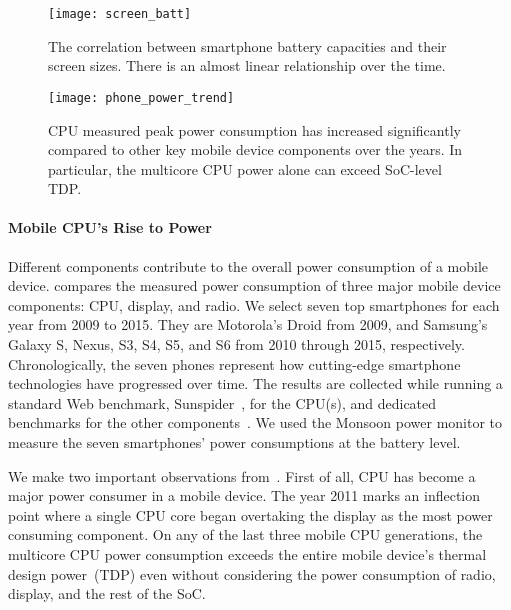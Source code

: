 \begin{figure}[t]
  \centering
  \texttt{[image: screen\_batt]}
  \caption{The correlation between smartphone battery capacities and their screen sizes. There is an almost linear relationship over the time.}
  \label{fig:screen_batt}
\end{figure}

\begin{figure}[t]
  \centering
  \texttt{[image: phone\_power\_trend]}
  \caption{CPU measured peak power consumption has increased significantly compared to other key mobile device components over the years. In particular, the multicore CPU power alone can exceed SoC-level TDP.}
  \label{fig:phone_power_trend}
\end{figure}

\paragraph{Mobile CPU's Rise to Power} Different components contribute to the overall power consumption of a mobile device.  compares the measured power consumption of three major mobile device components: CPU, display, and radio. We select seven top smartphones for each year from 2009 to 2015. They are Motorola's Droid from 2009, and Samsung's Galaxy S, Nexus, S3, S4, S5, and S6 from 2010 through 2015, respectively. Chronologically, the seven phones represent how cutting-edge smartphone technologies have progressed over time. The results are collected while running a standard Web benchmark, Sunspider~\cite{sunspider}, for the CPU(s), and dedicated benchmarks for the other components~\cite{carroll2010analysis,ookla}. We used the Monsoon power monitor to measure the seven smartphones' power consumptions at the battery level.

We make two important observations from~. First of all, CPU has become a major power consumer in a mobile device. The year 2011 marks an inflection point where a single CPU core began overtaking the display as the most power consuming component. On any of the last three mobile CPU generations, the multicore CPU power consumption exceeds the entire mobile device's thermal design power~(TDP) even without considering the power consumption of radio, display, and the rest of the SoC.

